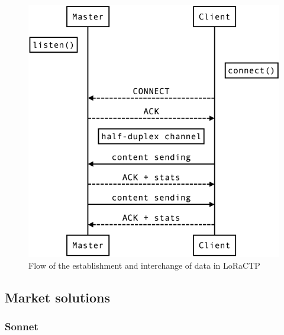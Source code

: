 				\begin{figure}[H]
					\centering
					\includegraphics[width=.5\textwidth]{resources/img/loractp_flow}
					\caption{Flow of the establishment and interchange of data in LoRaCTP}
				\end{figure}
		
		\subsection{Market solutions}
		
			\subsubsection{Sonnet}
		
